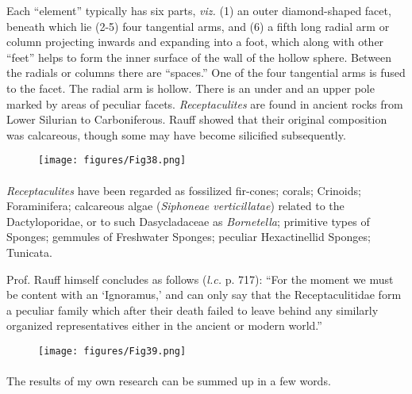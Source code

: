 \documentclass[a4paper, 12pt, oneside]{article}
\begin{document}
Each ``element'' typically has six parts, \emph{viz.} (1) an outer diamond-shaped facet, beneath which lie (2-5) four tangential arms, and (6) a fifth long radial arm or column projecting inwards and expanding into a foot, which along with other ``feet'' helps to form the inner surface of the wall of the hollow sphere. Between the radials or columns there are ``spaces.'' One of the four tangential arms is fused to the facet. The radial arm is hollow. There is an under and an upper pole marked by areas of peculiar facets. \emph{Receptaculites} are found in ancient rocks from Lower Silurian to Carboniferous. Rauff showed that their original composition was calcareous, though some may have become silicified subsequently.
\begin{figure}[H]
\centering
\texttt{[image: figures/Fig38.png]}
\caption*{}
\end{figure}
\paragraph{}
\emph{Receptaculites} have been regarded as fossilized fir-cones; corals; Crinoids; Foraminifera; calcareous algae (\emph{Siphoneae verticillatae}) related to the Dactyloporidae, or to such Dasycladaceae as \emph{Bornetella}; primitive types of Sponges; gemmules of Freshwater Sponges; peculiar Hexactinellid Sponges; Tunicata.

Prof. Rauff himself concludes as follows (\emph{l.c.} p. 717): ``For the moment we must be content with an `Ignoramus,' and can only say that the Receptaculitidae form a peculiar family which after their death failed to leave behind any similarly organized representatives either in the ancient or modern world.''
\begin{figure}[H]
\centering
\texttt{[image: figures/Fig39.png]}
\caption*{}
\end{figure}
\paragraph{}
The results of my own research can be summed up in a few words.
\end{document}
